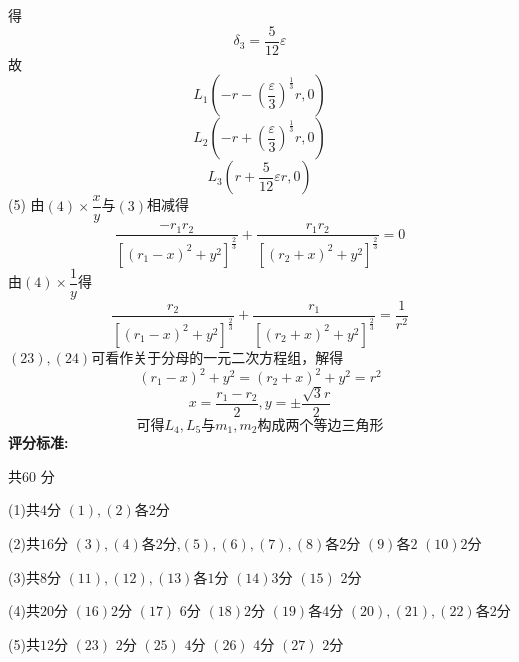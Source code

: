 \documentclass{article}
\begin{document}
得
\[
\delta_3=\dfrac{5}{12}\varepsilon\tag{19}
\]
故
\[
L_1\left(-r-(\dfrac{\varepsilon}{3})^{\frac{1}{3}}r,0\right)\tag{20}
\]
\[
L_2\left(-r+(\dfrac{\varepsilon}{3})^{\frac{1}{3}}r,0\right)\tag{21}
\]
\[
L_3\left(r+\dfrac{5}{12}\varepsilon r,0\right)\tag{22}
\]
(5)
由$(4)\times \dfrac{x}{y}$与$(3)$相减得
\[
\dfrac{-r_1 r_2}{[(r_1-x)^2+y^2]^{\frac{2}{3}}}
+\dfrac{r_1 r_2}{[(r_2+x)^2+y^2]^{\frac{2}{3}}}
=0\tag{23}
\]
由$(4)\times \dfrac{1}{y}$得
\[
\dfrac{r_2}{[(r_1-x)^2+y^2]^{\frac{2}{3}}}
+\dfrac{r_1}{[(r_2+x)^2+y^2]^{\frac{2}{3}}}
=\dfrac{1}{r^2}\tag{24}
\]
$(23),(24)$可看作关于分母的一元二次方程组，解得
\[
(r_1-x)^2+y^2=(r_2+x)^2+y^2=r^2\tag{25}
\]
\[
x=\dfrac{r_1-r_2}{2},y=\pm\dfrac{\sqrt{3}r}{2}\tag{26}
\]
\[
可得L_4,L_5与 m_1,m_2构成两个等边三角形\tag{27}
\]
\textbf{评分标准:}\par
共$60$ 分\par
(1)共$4$分 $(1),(2)$各$2$分\par
(2)共$16$分 $(3),(4)$各$2$分,$(5),(6),(7),(8)$各$2$分 $(9)$各$2$ $(10)$$2$分\par
(3)共$8$分 $(11),(12),(13)$各$1$分 $(14)$$3$分 $(15)$ $2$分\par
(4)共$20$分 $(16)$$2$分 $(17)$ $6$分 $(18)$$2$分 $(19)$各$4$分 $(20),(21),(22)$各$2$分\par
(5)共$12$分 $(23)$ $2$分 $(25)$ $4$分 $(26)$ $4$分 $(27)$ $2$分\par
\end{document}

